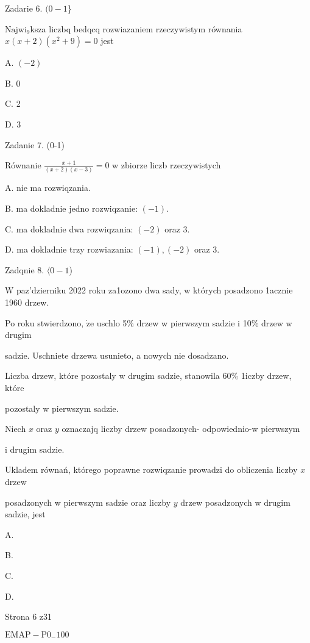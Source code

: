 \documentclass[a4paper,12pt]{article}
\begin{document}
Zadarie 6. $(0-1$\}

$\mathrm{N}\mathrm{a}\mathrm{j}\mathrm{w}\mathrm{i}_{9}$ksza liczbq bedqcq rozwiazaniem rzeczywistym równania $x(x+2)(x^{2}+9)=0$ jest

A. $(-2)$

B. 0

C. 2

D. 3

Zadanie 7. (0-1)

Równanie $\displaystyle \frac{x+1}{(x+2)(x-3)}=0$ w zbiorze liczb rzeczywistych

A. nie ma rozwiqzania.

B. ma dokladnie jedno rozwiqzanie: $(-1).$

C. ma dokladnie dwa rozwiqzania: $(-2)$ oraz 3.

D. ma dokladnie trzy rozwiazania: $(-1), (-2)$ oraz 3.

Zadqnie 8. $\langle 0-1$)

$\mathrm{W}$ paz'dzierniku 2022 roku za1ozono dwa sady, w których posadzono 1acznie 1960 drzew.

Po roku stwierdzono, $\dot{\mathrm{z}}\mathrm{e}$ uschlo 5\% drzew w pierwszym sadzie i 10\% drzew w drugim

sadzie. Uschniete drzewa usunieto, a nowych nie dosadzano.

Liczba drzew, które pozostaly w drugim sadzie, stanowila 60\% 1iczby drzew, które

pozostaly w pierwszym sadzie.

Niech $x$ oraz $y$ oznaczajq liczby drzew posadzonych- odpowiednio-w pierwszym

i drugim sadzie.

Ukladem równań, którego poprawne rozwiqzanie prowadzi do obliczenia liczby $x$ drzew

posadzonych w pierwszym sadzie oraz liczby $y$ drzew posadzonych w drugim sadzie, jest

A. 

B. 

C. 

D. 

Strona 6 z31

$\mathrm{E}\mathrm{M}\mathrm{A}\mathrm{P}-\mathrm{P}0_{-}100$
\end{document}
